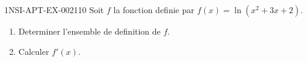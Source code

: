 \begin{exercice}{1NSI-APT-EX-002}{1}{10}
Soit $f$ la fonction definie par $f(x) = \ln(x^2 + 3x + 2)$.
\begin{enumerate}
  \item Determiner l'ensemble de definition de $f$.
  \item Calculer $f'(x)$.
\end{enumerate}

\end{exercice}
